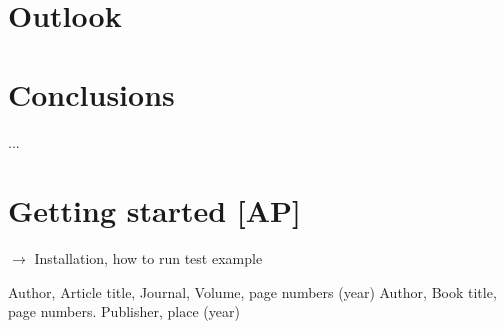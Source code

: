 \section{Outlook}
\label{out}



\section{Conclusions}
\label{conc}


\begin{acknowledgements}
...
\end{acknowledgements}


\appendix
\label{}

\section{Getting started  {\bf [AP]}}
\label{code_init}

$\to$ Installation, how to run test example



\begin{thebibliography}{}
%
%
Author, Article title, Journal, Volume, page numbers (year)
Author, Book title, page numbers. Publisher, place (year)
\end{thebibliography}



